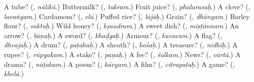 \begin{tcolorbox}[breakable,colback=teal!4,colframe=teal!35!black,title={Before you move on}]
A tube? (\textbf{}, \emph{nālikā}.) Buttermilk? (\textbf{}, \emph{takram}.) Fruit juice? (\textbf{}, \emph{phalarasaḥ}.) A clove? (\textbf{}, \emph{lavaṅgam}.) Cardamom? (\textbf{}, \emph{elā}.) Puffed rice? (\textbf{}, \emph{lājāḥ}.) Grain? (\textbf{}, \emph{dhānyam}.) Barley flour? (\textbf{}, \emph{saktuḥ}.) Wild honey? (\textbf{}, \emph{kṣaudram}.) A sweet dish? (\textbf{}, \emph{miṣṭānnam}.) An arrow? (\textbf{}, \emph{bāṇaḥ}.) A sword? (\textbf{}, \emph{khaḍgaḥ}.) Armour? (\textbf{}, \emph{kavacam}.) A flag? (\textbf{}, \emph{dhvajaḥ}.) A drum? (\textbf{}, \emph{paṭahaḥ}.) A sheath? (\textbf{}, \emph{kośaḥ}.) A treasure? (\textbf{}, \emph{nidhiḥ}.) A rupee? (\textbf{}, \emph{rūpyakam}.) A stake? (\textbf{}, \emph{paṇaḥ}.) A fee? (\textbf{}, \emph{śulkam}.) News? (\textbf{}, \emph{vārtā}.) A drama? (\textbf{}, \emph{nāṭakam}.) A poem? (\textbf{}, \emph{kāvyam}.) A film? (\textbf{}, \emph{citrapaṭaḥ}.) A game? (\textbf{}, \emph{khelā}.)
\end{tcolorbox}
